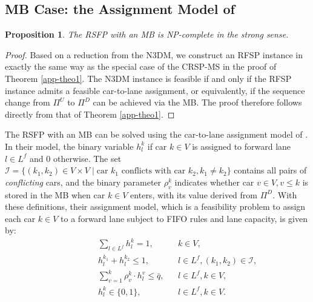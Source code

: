 \documentclass[12pt]{article}
\newtheorem{proposition}[theorem]{Proposition}
\begin{document}
\subsection{MB Case: the Assignment Model of \citet{guo2025logic}}
\begin{proposition}\label{app-pro2}
    The RSFP with an MB is NP-complete in the strong sense.
\end{proposition}
\begin{proof}
Based on a reduction from the N3DM, we construct an RFSP instance in exactly the same way as the special case of the CRSP-MS in the proof of Theorem \ref{app-theo1}. The N3DM instance is feasible if and only if the RFSP instance admits a feasible car-to-lane assignment, or equivalently, if the sequence change from $\Pi^U$ to $\Pi^D$ can be achieved via the MB. %
The proof therefore follows directly from that of Theorem \ref{app-theo1}.
\end{proof}

The RSFP with an MB can be solved using the car-to-lane assignment model of \citet{guo2025logic}. In their model, the binary variable $h^k_l$ if car $k\in V$ is assigned to forward lane $l\in L^f$ and 0 otherwise. The set $\mathcal{I}=\{(k_1,k_2)\in V\times V \mid \text{car } k_1 \text{ conflicts with car } k_2, k_1\neq k_2\}$ contains all pairs of \textit{conflicting} cars, and the binary parameter $\rho^k_v$ indicates whether car $v\in V, v\leqslant k$ is stored in the MB when car $k\in V$ enters, with its value derived from $\Pi^D$. With these definitions, their assignment model, which is a feasibility problem to assign each car $k\in V$ to a forward lane subject to FIFO rules and lane capacity, is given by: %
\begin{subequations}\label{m1}
    \begin{flalign}
        \label{con1}\qquad \qquad \qquad &\sum_{l\in L^f}{h^k_l}=1, &&k\in V, \\
        \label{con2}&h^{k_1}_l+h^{k_2}_l\leqslant 1, &&l\in L^f, (k_1,k_2)\in \mathcal{I}, \qquad \\
        \label{con3}&\sum_{v=1}^{k}{\rho^{k}_v \cdot h^v_l}\leqslant \bar{q}, &&l\in L^f, k\in V, \\
        \label{con4}&h^k_l\in \{0,1\}, &&l\in L^f, k\in V.
    \end{flalign}
\end{subequations}
\end{document}

